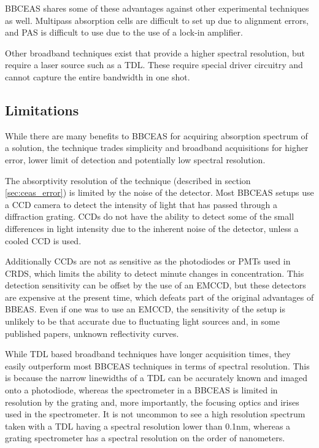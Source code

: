 \ac{BBCEAS} shares some of these advantages against other experimental
techniques as well. Multipass absorption cells are difficult to set up due to
alignment errors, and \ac{PAS} is difficult to use due to the use of a lock-in
amplifier.

Other broadband techniques exist that provide a higher spectral
resolution, but require a laser source such as a \acl{TDL}. These require
special driver circuitry and cannot capture the entire bandwidth in one shot.

\subsection{Limitations}

While there are many benefits to \ac{BBCEAS} for acquiring absorption spectrum
of a solution, the technique trades simplicity and broadband acquisitions for
higher error, lower limit of detection and potentially low spectral
resolution.

The absorptivity resolution of the technique (described in section
\ref{sec:ceas_error}) is limited by the noise of the detector. Most
\ac{BBCEAS} setups use a \ac{CCD} camera to detect the intensity of light that
has passed through a diffraction grating. \acp{CCD} do not have the ability to
detect some of the small differences in light intensity due to the inherent
noise of the detector, unless a cooled \ac{CCD} is used.

Additionally \acp{CCD} are not as sensitive as the photodiodes or \acp{PMT}
used in \ac{CRDS}, which limits the ability to detect minute changes in
concentration. This detection sensitivity can be offset by the use of an
\ac{EMCCD}, but these detectors are expensive at the present time, which
defeats part of the original advantages of \ac{BBEAS}. Even if one was to use
an \ac{EMCCD}, the sensitivity of the setup is unlikely to be that accurate
due to fluctuating light sources and, in some published papers, unknown
reflectivity curves.

While \ac{TDL} based broadband techniques have longer acquisition
times, they easily outperform most \ac{BBCEAS} techniques in terms of spectral
resolution. This is because the narrow linewidths of a \ac{TDL} can be
accurately known and imaged onto a photodiode, whereas the spectrometer in a
\ac{BBCEAS} is limited in resolution by the grating and, more importantly, the
focusing optics and irises used in the spectrometer. It is not uncommon to see
a high resolution spectrum taken with a \ac{TDL} having a spectral resolution
lower than 0.1nm, whereas a grating spectrometer has a spectral resolution on
the order of nanometers.


